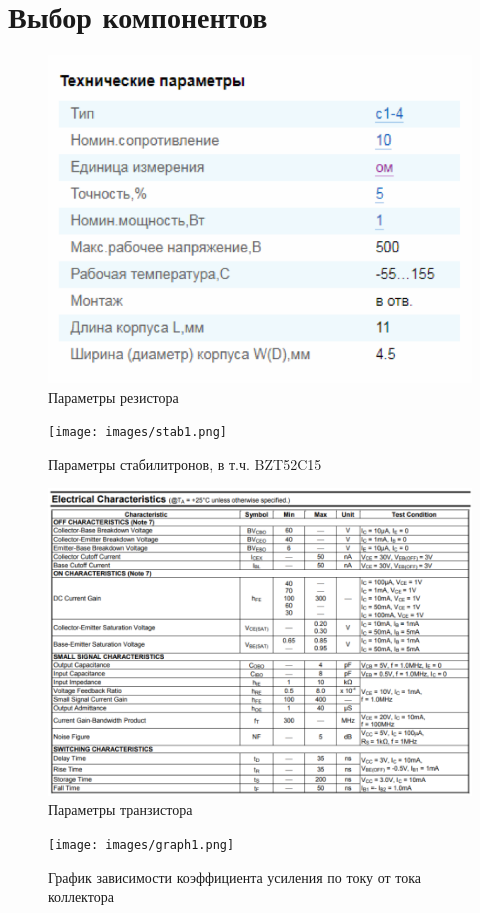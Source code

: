 \chapter{Выбор компонентов}


\begin{figure}
	\centering
	\caption{Параметры резистора}
	\includegraphics{images/resist1.png}
\end{figure}


\begin{figure}
	\centering
	\caption{Параметры стабилитронов, в т.ч. BZT52C15}
	\texttt{[image: images/stab1.png]}
\end{figure}

\begin{figure}
	\centering
	\caption{Параметры транзистора}
	\includegraphics{images/tran1.png}
\end{figure}

\begin{figure}
	\centering
	\caption{График зависимости коэффициента усиления по току от тока коллектора}
	\texttt{[image: images/graph1.png]}
\end{figure}
